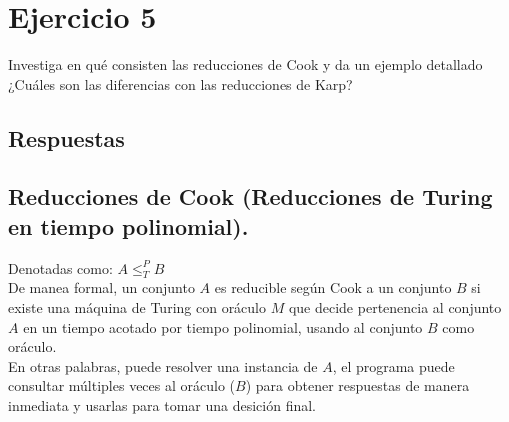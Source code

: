 \section{Ejercicio 5}


\begin{tcolorbox}[enunciado]
Investiga en qué consisten las reducciones de Cook y da un ejemplo detallado ¿Cuáles son las diferencias con las reducciones de Karp?
\end{tcolorbox}

\subsection*{Respuestas}
\subsection{Reducciones de Cook (Reducciones de Turing en tiempo polinomial).}
Denotadas como: $A\leq _T^PB$ \\
De manea formal, un conjunto $A$ es reducible según Cook a un conjunto $B$ si existe una máquina de Turing con oráculo $M$ que decide pertenencia al conjunto $A$ en un tiempo acotado por tiempo polinomial, usando al conjunto $B$ como oráculo. \\
En otras palabras, puede resolver una instancia de $A$, el programa puede consultar múltiples veces al oráculo ($B$) para obtener respuestas de manera inmediata y usarlas para tomar una desición final.

